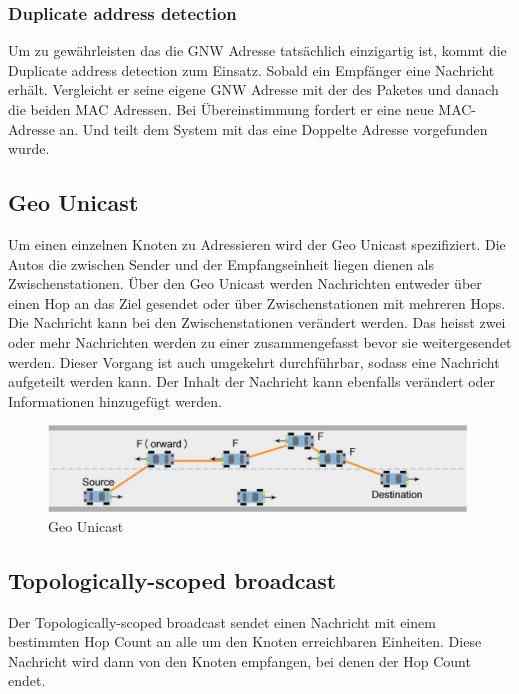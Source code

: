 \subsubsection{Duplicate address detection}
Um zu gewährleisten das die \acl{GNW} Adresse tatsächlich einzigartig ist, kommt die Duplicate address detection zum Einsatz. Sobald ein Empfänger eine Nachricht erhält. Vergleicht er seine eigene \acl{GNW} Adresse mit der des Paketes und danach die beiden MAC Adressen. Bei Übereinstimmung fordert er eine neue MAC-Adresse an. Und teilt dem System mit das eine Doppelte Adresse vorgefunden wurde. \cite{etsi302636-4-1}

\subsection{Geo Unicast}
Um einen einzelnen Knoten zu Adressieren wird der Geo Unicast spezifiziert. Die Autos die zwischen Sender und der Empfangseinheit liegen dienen als Zwischenstationen. Über den Geo Unicast werden Nachrichten entweder über einen Hop an das Ziel gesendet oder über Zwischenstationen mit mehreren Hops. Die Nachricht kann bei den Zwischenstationen verändert werden. Das heisst zwei oder mehr Nachrichten werden zu einer zusammengefasst bevor sie weitergesendet werden. Dieser Vorgang ist auch umgekehrt durchführbar, sodass eine Nachricht aufgeteilt werden kann. Der Inhalt der Nachricht kann ebenfalls verändert oder Informationen hinzugefügt werden. 

\begin{figure}
\includegraphics[width=0.99\textwidth]{content/images/03_networklayer/GeoUnicast.png}
\caption{Geo Unicast \cite{etsi102636-1}}
\label{fig:geounicast}
\end{figure}

\subsection{Topologically-scoped broadcast}
Der Topologically-scoped broadcast sendet einen Nachricht mit einem bestimmten Hop Count an alle um den Knoten erreichbaren Einheiten. Diese Nachricht wird dann von den Knoten empfangen, bei denen der Hop Count endet.

